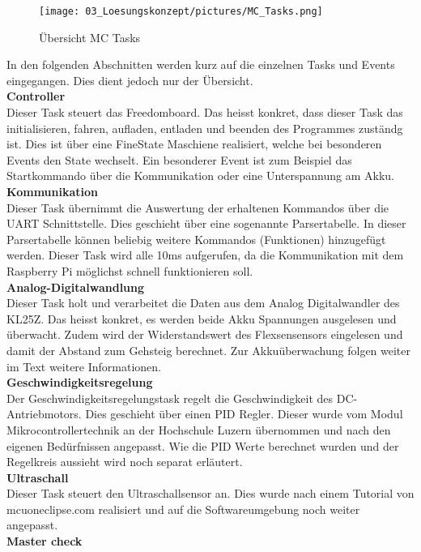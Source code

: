 \begin{figure}[H]
	\centering
	\texttt{[image: 03\_Loesungskonzept/pictures/MC\_Tasks.png]}
	\caption{Übersicht MC Tasks}
\end{figure}
In den folgenden Abschnitten werden kurz auf die einzelnen Tasks und Events eingegangen. Dies dient jedoch nur der Übersicht.\\
\textbf{Controller}\\[0.2cm]
Dieser Task steuert das Freedomboard. Das heisst konkret, dass dieser Task das initialisieren, fahren, aufladen, entladen  und beenden des Programmes zuständg ist. Dies ist über eine FineState Maschiene realisiert, welche bei besonderen Events den State wechselt. Ein besonderer Event ist zum Beispiel das Startkommando über die Kommunikation oder eine Unterspannung am Akku.\\[0.2cm]
\textbf{Kommunikation}\\[0.2cm]
Dieser Task übernimmt die Auswertung der erhaltenen Kommandos über die UART Schnittstelle. Dies geschieht über eine sogenannte Parsertabelle. In dieser Parsertabelle können beliebig weitere Kommandos (Funktionen) hinzugefügt werden. Dieser Task wird alle 10ms aufgerufen, da die Kommunikation mit dem Raspberry Pi möglichst schnell funktionieren soll.\\[0.2cm]
\textbf{Analog-Digitalwandlung}\\[0.2cm]
Dieser Task holt und verarbeitet die Daten aus dem Analog Digitalwandler des KL25Z. Das heisst konkret, es werden beide Akku Spannungen ausgelesen und überwacht. Zudem wird der Widerstandswert des Flexsensensors eingelesen und damit der Abstand zum Gehsteig berechnet. Zur Akkuüberwachung folgen weiter im Text weitere Informationen.\\[0.2cm]
\textbf{Geschwindigkeitsregelung}\\[0.2cm]
Der Geschwindigkeitsregelungstask regelt die Geschwindigkeit des DC-Antriebmotors. Dies geschieht über einen PID Regler. Dieser wurde vom Modul Mikrocontrollertechnik an der Hochschule Luzern übernommen und nach den eigenen Bedürfnissen angepasst. Wie die PID Werte berechnet wurden und der Regelkreis aussieht wird noch separat erläutert.\\[0.2cm]
\textbf{Ultraschall}\\[0.2cm]
Dieser Task steuert den Ultraschallsensor an. Dies wurde nach einem Tutorial von mcuoneclipse.com realisiert und auf die Softwareumgebung noch weiter angepasst.\\[0.2cm]
\textbf{Master check}\\[0.2cm]
